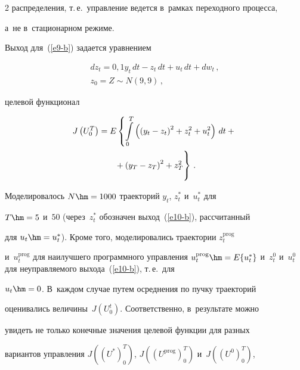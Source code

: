 \begin{multicols}{2}
распределения, т.\,е.\ управление ведется в~рамках переходного процесса, 


а~не в~стационарном режиме.


     


     Выход для~(\ref{e9-b}) задается уравнением


          \begin{multline}


     dz_t=0{,}1 y_t\, dt-z_t \,dt+u_t \,dt+dw_t\,,\\ z_0=Z\sim N(9, 9)\,,


     \label{e10-b}


     \end{multline}


    целевой функционал


\begin{multline*}


J\left( U_0^T\right) =E\left\{ \int\limits_0^T \left( \left( y_t-


z_t\right)^2+z_t^2+u_t^2\right) \,dt +{}\right.\\


\left.{}+\left( y_T -z_T\right)^2+z_T^2


     \vphantom{\int\limits_0^T}


     \right\}\,.




\end{multline*}


     


     Моделировалось $N\hm=1000$ траекторий $y_t$, $z_t^*$ и~$u_t^*$ для 


$T\hm=5$ и~$50$ (через~$z_t^*$ обозначен выход~(\ref{e10-b}), рассчитанный 


для $u_t\hm=u_t^*$). Кроме того, моделировались траектории $z_t^{\mathrm{prog}}$ 


и~$u_t^{\mathrm{prog}}$ для наилучшего программного управления $u_t^{\mathrm{prog}}\hm= E\{ 


u_t^*\}$ и~$z_t^0$ и~$u_t^0$ для неуправляемого выхода~(\ref{e10-b}), т.\,е.\ для 


$u_t\hm=0$. В~каждом случае путем осреднения по пучку траекторий 


оценивались величины~$J(U_0^t)$. Соответственно, в~результате можно 


увидеть не только конечные значения целевой функции для разных 


вариантов управления $J((U^*)_0^T)$, $J((U^{\mathrm{prog}})_0^T)$ и~$J((U^0)_0^T)$, 



\end{multicols}
